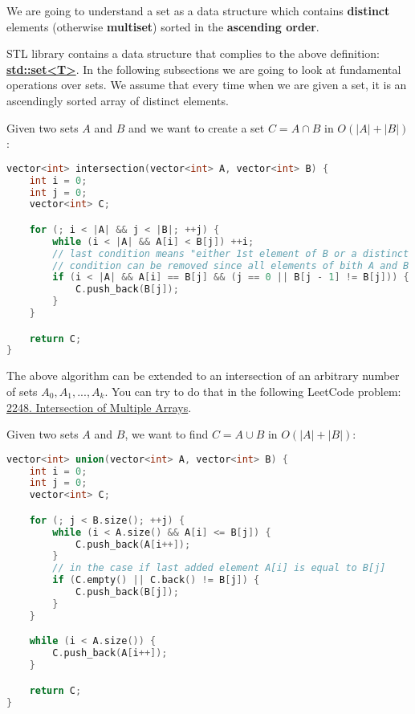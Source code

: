 
We are going to understand a set as a data structure which contains \textbf{distinct} elements (otherwise \textbf{multiset}) sorted in the \textbf{ascending order}.

STL library contains a data structure that complies to the above definition: \href{https://en.cppreference.com/w/cpp/container/set}{\textbf{std::set<T>}}. In the following subsections we are going to look at fundamental operations over sets. We assume that every time when we are given a set, it is an ascendingly sorted array of distinct elements.


Given two sets $A$ and $B$ and we want to create a set $C = A \cap B$ in $O(|A| + |B|)$:

\begin{lstlisting}[language=C++]
vector<int> intersection(vector<int> A, vector<int> B) {
    int i = 0;
    int j = 0;
    vector<int> C;

    for (; i < |A| && j < |B|; ++j) {
        while (i < |A| && A[i] < B[j]) ++i;
        // last condition means "either 1st element of B or a distinct element"
        // condition can be removed since all elements of bith A and B are distinct
        if (i < |A| && A[i] == B[j] && (j == 0 || B[j - 1] != B[j])) {
            C.push_back(B[j]);
        }
    }

    return C;
}
\end{lstlisting}

The above algorithm can be extended to an intersection of an arbitrary number of sets $A_0, A_1, ..., A_k$. You can try to do that in the following LeetCode problem: \href{https://leetcode.com/problems/intersection-of-multiple-arrays/description/}{2248. Intersection of Multiple Arrays}.




Given two sets $A$ and $B$, we want to find $C = A \cup B$ in $O(|A| + |B|)$:

\begin{lstlisting}[language=C++]
vector<int> union(vector<int> A, vector<int> B) {
    int i = 0;
    int j = 0;
    vector<int> C;

    for (; j < B.size(); ++j) {
        while (i < A.size() && A[i] <= B[j]) {
            C.push_back(A[i++]);
        }
        // in the case if last added element A[i] is equal to B[j]
        if (C.empty() || C.back() != B[j]) {
            C.push_back(B[j]);
        }
    }

    while (i < A.size()) {
        C.push_back(A[i++]);
    }

    return C;
}
\end{lstlisting}

